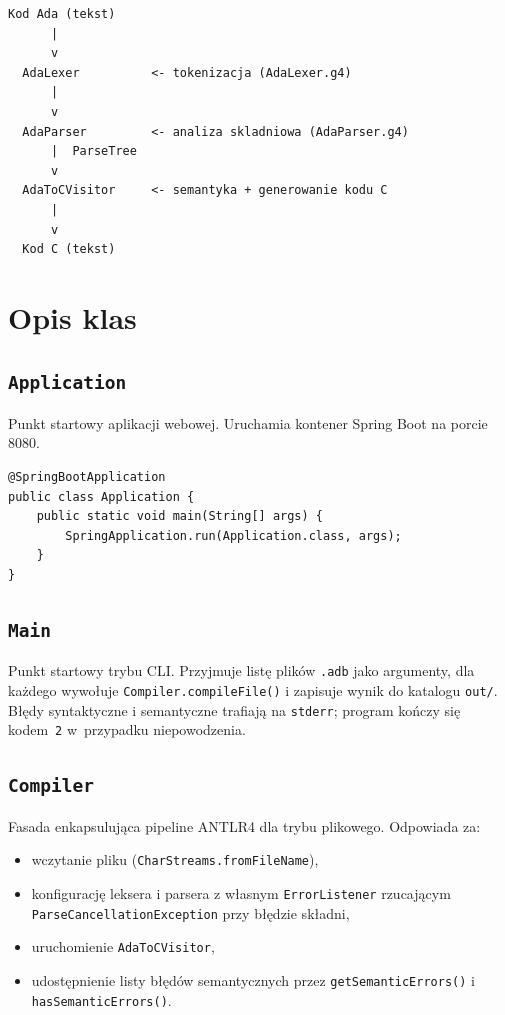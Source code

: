 \documentclass[12pt,a4paper]{article}
\begin{document}
\begin{lstlisting}[style=bnf, caption={Schemat pipeline'u}]
Kod Ada (tekst)
      |
      v
  AdaLexer          <- tokenizacja (AdaLexer.g4)
      |
      v
  AdaParser         <- analiza skladniowa (AdaParser.g4)
      |  ParseTree
      v
  AdaToCVisitor     <- semantyka + generowanie kodu C
      |
      v
  Kod C (tekst)
\end{lstlisting}

\section{Opis klas}

\subsection{\texttt{Application}}

Punkt startowy aplikacji webowej. Uruchamia kontener Spring Boot na porcie 8080.

\begin{lstlisting}[style=c, caption={Klasa Application}]
@SpringBootApplication
public class Application {
    public static void main(String[] args) {
        SpringApplication.run(Application.class, args);
    }
}
\end{lstlisting}

\subsection{\texttt{Main}}

Punkt startowy trybu CLI. Przyjmuje listę plików \texttt{.adb} jako argumenty,
dla każdego wywołuje \texttt{Compiler.compileFile()} i zapisuje wynik do
katalogu \texttt{out/}. Błędy syntaktyczne i semantyczne trafiają na
\texttt{stderr}; program kończy się kodem~\texttt{2} w~przypadku niepowodzenia.

\subsection{\texttt{Compiler}}

Fasada enkapsulująca pipeline ANTLR4 dla trybu plikowego.
Odpowiada za:
\begin{itemize}
  \item wczytanie pliku (\texttt{CharStreams.fromFileName}),
  \item konfigurację leksera i parsera z własnym \texttt{ErrorListener}
        rzucającym \texttt{ParseCancellationException} przy błędzie składni,
  \item uruchomienie \texttt{AdaToCVisitor},
  \item udostępnienie listy błędów semantycznych przez
        \texttt{getSemanticErrors()} i \texttt{hasSemanticErrors()}.
\end{itemize}
\end{document}
